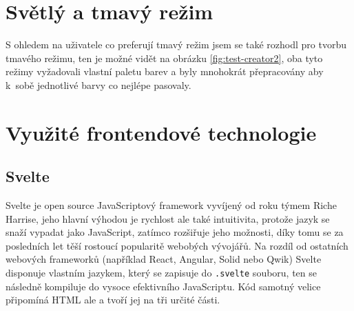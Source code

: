 \documentclass[12pt, a4paper,
openright
]{report}
\begin{document}
\section{Světlý a tmavý režim}
S ohledem na uživatele co preferují tmavý režim jsem se také rozhodl pro tvorbu tmavého režimu, ten je možné vidět na obrázku \ref{fig:test-creator2}, oba tyto režimy vyžadovali vlastní paletu barev a byly mnohokrát přepracovány aby k~sobě jednotlivé barvy co nejlépe pasovaly.

\section{Využité frontendové technologie}
\subsection{Svelte}
Svelte je open source JavaScriptový framework vyvíjený od roku týmem Riche Harrise, jeho hlavní výhodou je rychlost ale také intuitivita, protože jazyk se snaží vypadat jako JavaScript, zatímco rozšiřuje jeho možnosti, díky tomu se za posledních let těší rostoucí popularitě webobých vývojářů. Na rozdíl od ostatních webových frameworků (například React, Angular, Solid nebo Qwik) Svelte disponuje vlastním jazykem, který se zapisuje do \texttt{.svelte} souboru, ten se následně kompiluje do vysoce efektivního JavaScriptu. Kód samotný velice připomíná HTML ale a tvoří jej na tři určité části.
\end{document}
